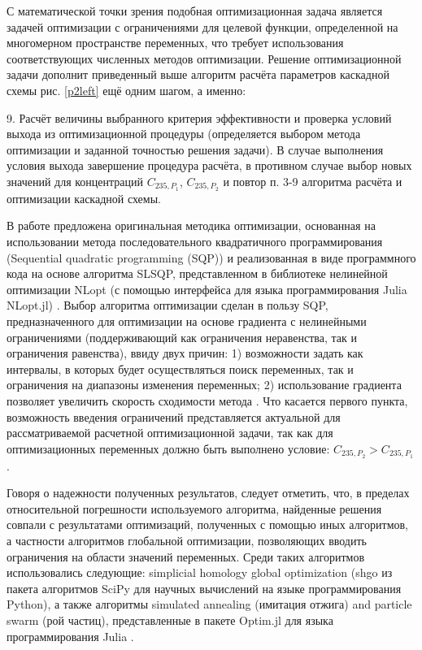 С математической точки зрения подобная оптимизационная задача является задачей оптимизации с ограничениями для целевой функции, определенной на многомерном пространстве переменных, что требует использования соответствующих численных методов оптимизации. Решение оптимизационной задачи дополнит приведенный выше алгоритм расчёта параметров каскадной схемы рис. \ref{p2left} ещё одним шагом, а именно: 

9. Расчёт величины выбранного критерия эффективности и проверка условий выхода из оптимизационной процедуры (определяется выбором метода оптимизации и заданной точностью решения задачи). В случае выполнения условия выхода завершение процедура расчёта, в противном случае выбор новых значений для концентраций $C_{235,{P_1}}$, $C_{235,{P_2}}$ и повтор п. 3-9 алгоритма расчёта и оптимизации каскадной схемы. 

В работе предложена оригинальная методика оптимизации, основанная на использовании метода последовательного квадратичного программирования (Sequential quadratic programming (SQP)) и реализованная в виде программного кода на основе алгоритма SLSQP, представленном в библиотеке нелинейной оптимизации NLopt (с помощью интерфейса для языка программирования Julia NLopt.jl) \cite{NLopt}. Выбор алгоритма оптимизации сделан в пользу SQP, предназначенного для оптимизации на основе градиента с нелинейными ограничениями (поддерживающий как ограничения неравенства, так и ограничения равенства), ввиду двух причин: 1) возможности задать как интервалы, в которых будет осуществляться поиск переменных, так и ограничения на диапазоны изменения переменных; 2) использование градиента позволяет увеличить скорость сходимости метода \cite{NumericalOptimization2006}. Что касается первого пункта, возможность введения ограничений представляется актуальной для рассматриваемой расчетной оптимизационной задачи, так как для оптимизационных переменных должно быть выполнено условие: ${C_{235,{P_2}}}>{C_{235,{P_1}}}$. 

Говоря о надежности полученных результатов, следует отметить, что, в пределах относительной погрешности используемого алгоритма, найденные решения совпали с результатами оптимизаций, полученных с помощью иных алгоритмов, а частности алгоритмов глобальной оптимизации, позволяющих вводить ограничения на области значений переменных. Среди таких алгоритмов использовались следующие: simplicial homology global optimization (shgo из пакета алгоритмов SciPy для научных вычислений на языке программирования Python), а также алгоритмы simulated annealing (имитация отжига) and particle swarm (рой частиц), представленные в пакете Optim.jl для языка программирования Julia \cite{virtanenSciPyFundamentalAlgorithms2020, mogensenOptimMathematicalOptimization2018}.

